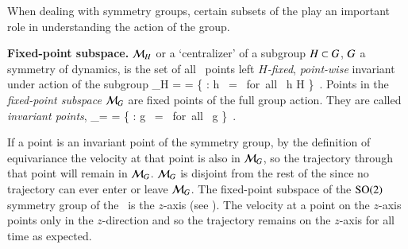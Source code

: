 
When dealing with symmetry groups, certain subsets of the {\statesp} play an important role in understanding the action of the group.

\begin{definition}
\label{def:centralizer}
\textbf{Fixed-point subspace.}
${\cal M}_H$ or a `centralizer' of a subgroup $H \subset G$,
$G$ a symmetry of dynamics, is the set of all \statesp\
points left \emph{$H$-fixed}, \emph{point-wise} invariant
under action of the subgroup
\beq
\pS_H =  =
   \{ \ssp \in \pS : {h} \, \ssp = \ssp \mbox{ for all } h \in H \}
\,.
Points in the \emph{fixed-point subspace}  ${\cal M}_{G}$ are fixed
points of the full group action. They are called \emph{invariant
points},
\beq
\pS_\Group = \Fix{\Group} =
   \{ \ssp \in \pS : {g} \, \ssp = \ssp \mbox{ for all } g \in \Group \}
\,.
\end{definition}

If a point is an invariant point of the symmetry group, by the definition of equivariance  the velocity at that point is also in ${\cal M}_{G}$, so the trajectory through that point will remain in ${\cal M}_{G}$. ${\cal M}_{G}$ is disjoint from the rest of the {\statesp} since no trajectory can ever enter or leave ${\cal M}_{G}$. The fixed-point subspace of the $\textrm{SO}(2)$ symmetry group of the \cLe\ is the $z$-axis (see ). The velocity  at a point on the $z$-axis points only in the $z$-direction and so the trajectory remains on the $z$-axis for all time as expected.

